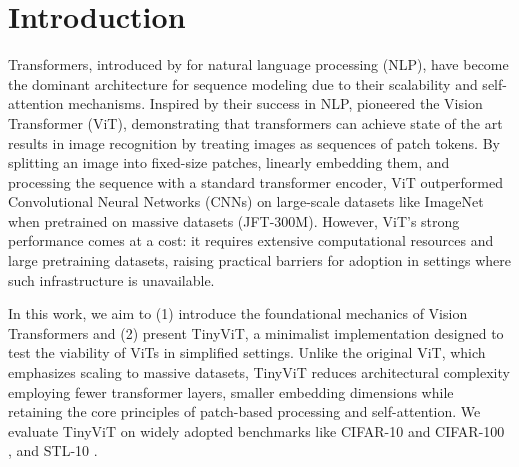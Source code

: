 \section{Introduction}

Transformers, introduced by \cite{vaswani2017attention} for natural language processing (NLP), have become the dominant architecture for sequence modeling due to their scalability and self-attention mechanisms. Inspired by their success in NLP, \cite{alexey2020image} pioneered the Vision Transformer (ViT), demonstrating that transformers can achieve state of the art results in image recognition by treating images as sequences of patch tokens. By splitting an image into fixed-size patches, linearly embedding them, and processing the sequence with a standard transformer encoder, ViT outperformed Convolutional Neural Networks (CNNs) \cite{he2016deep} on large-scale datasets like ImageNet when pretrained on massive datasets (JFT-300M). However, ViT’s strong performance comes at a cost: it requires extensive computational resources and large pretraining datasets, raising practical barriers for adoption in settings where such infrastructure is unavailable.

In this work, we aim to (1) introduce the foundational mechanics of Vision Transformers and (2) present TinyViT, a minimalist implementation designed to test the viability of ViTs in simplified settings. Unlike the original ViT, which emphasizes scaling to massive datasets, TinyViT reduces architectural complexity employing fewer transformer layers, smaller embedding dimensions while retaining the core principles of patch-based processing and self-attention. We evaluate TinyViT on widely adopted benchmarks like CIFAR-10 and CIFAR-100 \cite{krizhevsky2009learning}, and STL-10 \cite{coates2011analysis}.